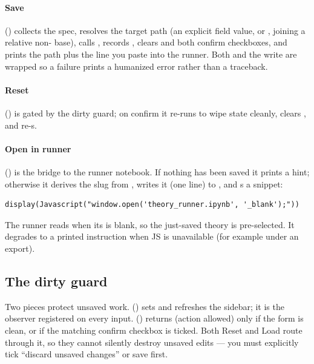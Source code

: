 \paragraph{Save}  () collects the
spec, resolves the target path (an explicit field value, or ,
joining a relative non- base), calls ,
records , clears  and both confirm checkboxes, and
prints the path plus the  line you paste into the
runner. Both  and the write are wrapped so a failure prints a
humanized error rather than a traceback.

\paragraph{Reset}  () is gated by
the dirty guard; on confirm it re-runs  to wipe state
cleanly, clears , and re-s.

\paragraph{Open in runner} 
() is the bridge to the runner notebook. If nothing
has been saved it prints a hint; otherwise it derives the slug from
, writes it (one line) to , and
s a  snippet:

\begin{lstlisting}
display(Javascript("window.open('theory_runner.ipynb', '_blank');"))
\end{lstlisting}

The runner reads  when its  is
blank, so the just-saved theory is pre-selected. It degrades to a printed
instruction when JS is unavailable (for example under an  export).

\subsection{The dirty guard}

Two pieces protect unsaved work. 
() sets  and refreshes the
sidebar; it is the observer registered on every input. 
() returns  (action allowed) only if the
form is clean, or if the matching confirm checkbox is ticked. Both Reset and Load
route through it, so they cannot silently destroy unsaved edits --- you must
explicitly tick ``discard unsaved changes'' or save first.

